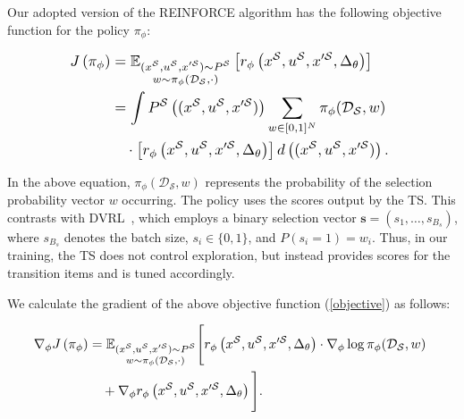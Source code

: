 Our adopted version of the REINFORCE algorithm has the following objective function for the policy $\pi_\phi$:

\begin{equation}
\label{objective}
\resizebox{0.75\hsize}{!}{%
\begin{math}
\begin{aligned}
J\left(\pi_{\phi}\right)&= \mathbb{E}_{\substack{\substack{(x^{\mathcal{S}}, u^{\mathcal{S}}, x^{\prime \mathcal{S}}) \sim P^{\mathcal{S}}\\ w \sim \pi_{\phi}(\mathcal{D_S}, \cdot)}}}\left[r_\phi\left(x^{\mathcal{S}}, u^{\mathcal{S}}, x^{\prime \mathcal{S}}, \Delta_\theta\right)\right] \\
&=\int P^{\mathcal{S}}\left((x^{\mathcal{S}}, u^{\mathcal{S}}, x^{\prime \mathcal{S}})\right) \sum_{w \in[0,1]^{N}} \pi_{\phi}(\mathcal{D_S}, w) \\
&\quad \cdot\left[r_\phi\left(x^{\mathcal{S}}, u^{\mathcal{S}}, x^{\prime \mathcal{S}}, \Delta_\theta\right)\right] d \left((x^{\mathcal{S}}, u^{\mathcal{S}}, x^{\prime \mathcal{S}})\right).
\end{aligned}
\end{math}
}
\end{equation}



In the above equation, \(\pi_{\phi}(\mathcal{D_S}, w)\) represents the probability of the selection probability vector \(w\) occurring. The policy uses the scores output by the TS. This contrasts with DVRL~\citep{yoon2020data}, which employs a binary selection vector \(\mathbf{s} = \left(s_1, \ldots, s_{B_s}\right)\), where \(s_{B_s}\) denotes the batch size, \(s_i \in \{0,1\}\), and \(P\left(s_i = 1\right) = w_i\). Thus, in our training, the TS does not control exploration, but instead provides scores for the transition items and is tuned accordingly. 


We calculate the gradient of the above objective function (\autoref{objective}) as follows:

\begin{equation}
\label{grad-eq}
\resizebox{0.92\hsize}{!}{%
\begin{math}
\begin{aligned}
    \nabla_{\phi} J\left(\pi_{\phi}\right) 
    &= \mathbb{E}_{\substack{(x^{\mathcal{S}}, u^{\mathcal{S}}, x^{\prime \mathcal{S}}) \sim P^{\mathcal{S}}\\ w \sim \pi_{\phi}(\mathcal{D_S}, \cdot)}} \Bigg[ r_\phi\left(x^{\mathcal{S}}, u^{\mathcal{S}}, x^{\prime \mathcal{S}}, \Delta_\theta\right) \cdot \nabla_{\phi} \log \pi_{\phi}(\mathcal{D_S}, w) \\
    & \quad + \nabla_{\phi} r_\phi\left(x^{\mathcal{S}}, u^{\mathcal{S}}, x^{\prime \mathcal{S}}, \Delta_\theta\right) \Bigg].
\end{aligned}
\end{math}
}
\end{equation}



